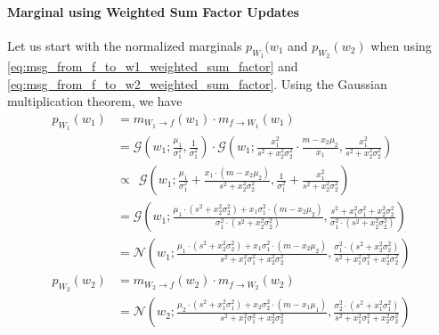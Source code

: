 \documentclass[a4paper]{article}
\newcommand{\Normal}[3]{{\mathcal N} \left({#1};{#2},{#3}\right)}
\newcommand{\Gauss}[3]{{\mathcal G} \left({#1};{#2},{#3}\right)}
\theoremstyle{definition}
\begin{document}
\paragraph{Marginal using Weighted Sum Factor Updates} Let us start with the normalized marginals $p_{W_1}(w_1$ and $p_{W_2}(w_2)$ when using \eqref{eq:msg_from_f_to_w1_weighted_sum_factor} and \eqref{eq:msg_from_f_to_w2_weighted_sum_factor}. Using the Gaussian multiplication theorem, we have
\begin{align}
    p_{W_1}(w_1) & = m_{W_1 \to f}(w_1) \cdot m_{f \to W_1}(w_1) \nonumber \\
    & = \Gauss{w_1}{\frac{\mu_1}{\sigma_1^2}}{\frac{1}{\sigma_1^2}} \cdot \Gauss{w_1}{\frac{x_1^2}{s^2 + x_2^2 \sigma_2^2} \cdot \frac{m - x_2 \mu_2}{x_1}}{\frac{x_1^2}{s^2 + x_2^2 \sigma_2^2}} \nonumber \\
    & \propto \ \ \Gauss{w_1}{\frac{\mu_1}{\sigma_1^2} + \frac{x_1 \cdot \left( m - x_2 \mu_2 \right)}{s^2 + x_2^2 \sigma_2^2}}{\frac{1}{\sigma_1^2} + \frac{x_1^2}{s^2 + x_2^2 \sigma_2^2}} \nonumber \\
    & = \Gauss{w_1}{\frac{\mu_1 \cdot \left( s^2 + x_2^2 \sigma_2^2 \right) + x_1 \sigma_1^2 \cdot \left( m - x_2 \mu_2 \right)}{\sigma_1^2 \cdot \left( s^2 + x_2^2 \sigma_2^2 \right)}}{\frac{s^2 + x_1^2 \sigma_1^2 + x_2^2 \sigma_2^2}{\sigma_1^2 \cdot \left( s^2 + x_2^2 \sigma_2^2 \right)}} \nonumber \\
    & = \Normal{w_1}{\frac{\mu_1 \cdot \left( s^2 + x_2^2 \sigma_2^2 \right) + x_1 \sigma_1^2 \cdot \left( m - x_2 \mu_2 \right)}{s^2 + x_1^2 \sigma_1^2 + x_2^2 \sigma_2^2}}{\frac{\sigma_1^2 \cdot \left( s^2 + x_2^2 \sigma_2^2 \right)}{s^2 + x_1^2 \sigma_1^2 + x_2^2 \sigma_2^2}} \label{eq:p_w1_weighted_sum_factor} \\
    p_{W_2}(w_2) & = m_{W_2 \to f}(w_2) \cdot m_{f \to W_2}(w_2) \nonumber \\
    & = \Normal{w_2}{\frac{\mu_2 \cdot \left( s^2 + x_1^2 \sigma_1^2 \right) + x_2 \sigma_2^2 \cdot \left( m - x_1 \mu_1 \right)}{s^2 + x_1^2 \sigma_1^2 + x_2^2 \sigma_2^2}}{\frac{\sigma_2^2 \cdot \left( s^2 + x_1^2 \sigma_1^2 \right)}{s^2 + x_1^2 \sigma_1^2 + x_2^2 \sigma_2^2}} \label{eq:p_w2_weighted_sum_factor}
\end{align}
\end{document}
